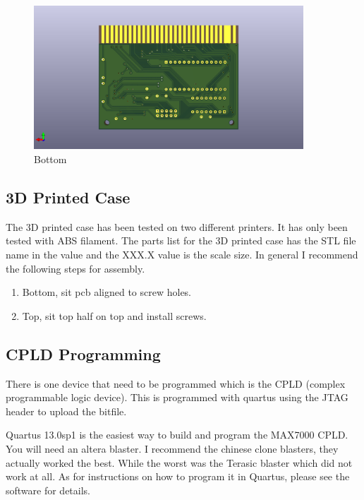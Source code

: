 \begin{figure}[h!]
\caption{Bottom}
\centering
\includegraphics[width=0.90\textwidth,keepaspectratio]{img/ogm_bottom.png}
\end{figure}

\subsection{3D Printed Case}

\par
The 3D printed case has been tested on two different printers. It has only been tested with ABS filament.
The parts list for the 3D printed case has the STL file name in the value and the XXX.X value is the scale size.
In general I recommend the following steps for assembly.

\begin{enumerate}
  \item Bottom, sit pcb aligned to screw holes.
  \item Top, sit top half on top and install screws.
\end{enumerate}

\subsection{CPLD Programming}

\par
There is one device that need to be programmed which is the CPLD (complex programmable logic device).
This is programmed with quartus using the JTAG header to upload the bitfile.
\par
Quartus 13.0sp1 is the easiest way to build and program the MAX7000 CPLD. You will need an altera blaster.
I recommend the chinese clone blasters, they actually worked the best. While the worst was the Terasic blaster
which did not work at all. As for instructions on how to program it in Quartus, please see the software for details.

